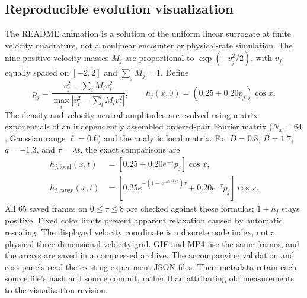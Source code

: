 \documentclass[11pt,letterpaper]{article}
\begin{document}
\subsection*{Reproducible evolution visualization}
The README animation is a solution of the uniform linear surrogate at finite
velocity quadrature, not a nonlinear encounter or physical-rate simulation.
The nine positive velocity masses $M_j$ are proportional to
$\exp(-v_j^2/2)$, with $v_j$ equally spaced on $[-2,2]$ and
$\sum_jM_j=1$. Define
\begin{equation}
 p_j=\frac{v_j^2-\sum_iM_iv_i^2}{\max_i|v_i^2-\sum_lM_lv_l^2|},
 \qquad h_j(x,0)=(0.25+0.20p_j)\cos x.
\end{equation}
The density and velocity-neutral amplitudes are evolved using matrix
exponentials of an independently assembled ordered-pair Fourier matrix
($N_x=64$, Gaussian range $\ell=0.6$) and the analytic local matrix.
For $D=0.8$, $B=1.7$, $q=-1.3$, and $\tau=\lambda t$, the exact comparisons are
\begin{align}
 h_{j,\mathrm{local}}(x,t)&=[0.25+0.20e^{-\tau}p_j]\cos x,\\
 h_{j,\mathrm{range}}(x,t)&=[0.25e^{-(1-e^{-0.6^2/2})\tau}
                            +0.20e^{-\tau}p_j]\cos x.
\end{align}
All 65 saved frames on $0\leq\tau\leq8$ are checked against these formulas;
$1+h_j$ stays positive. Fixed color limits prevent apparent relaxation caused
by automatic rescaling. The displayed velocity coordinate is a discrete node
index, not a physical three-dimensional velocity grid. GIF and MP4 use the
same frames, and the arrays are saved in a compressed archive.
The accompanying validation and cost panels read the existing experiment JSON
files. Their metadata retain each source file's hash and source commit, rather
than attributing old measurements to the visualization revision.
\end{document}
